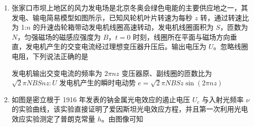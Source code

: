 \documentclass[\gkver]{gaokaozhenti}
\begin{document}
\begin{enumerate}
{$G\frac{Mm}{r^{2}}=m\frac{v^{2}}{r}$

解得公转的线速度大小为

$v=\sqrt{\frac{GM}{r}}$

其中中心天体的质量之比为 2:1，公转的轨道半径相等，则望舒与地球公转速度大小的比值为 $\sqrt{2}$，故选 C。
}

\item
张家口市坝上地区的风力发电场是北京冬奥会绿色电能的主要供应地之一，其发电、输电简易模型如图所示，已知风轮机叶片转速为每秒 $z$ 转，通过转速比为 1:$n$ 的升速齿轮箱带动发电机线圈高速转动，发电机线圈面积为 $S$，匝数为 $N$，匀强磁场的磁感应强度为 $B$，$t=0$ 时刻，线圈所在平面与磁场方向垂直，发电机产生的交变电流经过理想变压器升压后。输出电压为 $U$。忽略线圈电阻，下列说法正确的是


{发电机输出交变电流的频率为 $2\pi nz$}
{变压器原、副线圈的匝数比为 $\sqrt{2}\pi NBSnz:U$}
{发电机产生的瞬时电动势 $e=\sqrt{2}\pi NBSz\sin(2\pi nz)$}


\item
如图是密立根于 1916 年发表的钠金属光电效应的遏止电压 $U_{c}$ 与入射光频率 $\nu$ 的实验曲线，该实验直接证明了爱因斯坦光电效应方程，并且第一次利用光电效应实验测定了普朗克常量 $h$。由图像可知


\end{enumerate}
\end{document}
